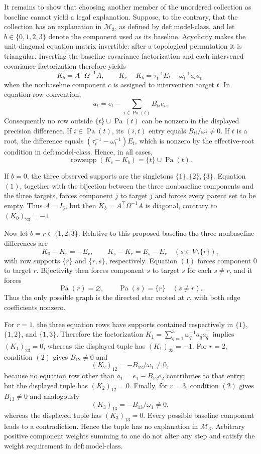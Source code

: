 It remains to show that choosing another member of the unordered collection
as baseline cannot yield a legal explanation.  Suppose, to the contrary, that
the collection has an explanation in \(\mathcal M_3\), as defined by
\(\mathrm{def:model\mbox{-}class}\), and let \(b\in\{0,1,2,3\}\) denote the
component used as its baseline.  Acyclicity makes the unit-diagonal equation
matrix invertible: after a topological permutation it is triangular.  Inverting
the baseline covariance factorization and each intervened covariance
factorization therefore yields
\[
 K_b=A^{\top}\Omega^{-1}A,
 \qquad
 K_c-K_b=\tau_t^{-1}E_t-\omega_t^{-1}a_ta_t^{\top}
\]
when the nonbaseline component \(c\) is assigned to intervention target
\(t\).  In equation-row convention,
\[
 a_t=e_t-\sum_{i\in\operatorname{Pa}(t)}B_{ti}e_i.
\]
Consequently no row outside
\(\{t\}\cup\operatorname{Pa}(t)\) can be nonzero in the displayed precision
difference.  If \(i\in\operatorname{Pa}(t)\), its \((i,t)\) entry equals
\(B_{ti}/\omega_t\neq0\).  If \(t\) is a root, the difference equals
\((\tau_t^{-1}-\omega_t^{-1})E_t\), which is nonzero by the effective-root
condition in \(\mathrm{def:model\mbox{-}class}\).  Hence, in all cases,
\[
 \operatorname{rowsupp}(K_c-K_b)=\{t\}\cup\operatorname{Pa}(t).
 \tag{1}
\]

If \(b=0\), the three observed supports are the singletons
\(\{1\},\{2\},\{3\}\).  Equation \((1)\), together with the bijection between
the three nonbaseline components and the three targets, forces component
\(j\) to target \(j\) and forces every parent set to be empty.  Thus
\(A=I_3\), but then \(K_b=A^{\top}\Omega^{-1}A\) is diagonal, contrary to
\((K_0)_{23}=-1\).

Now let \(b=r\in\{1,2,3\}\).  Relative to this proposed baseline the three
nonbaseline differences are
\[
 K_0-K_r=-E_r,
 \qquad K_s-K_r=E_s-E_r\quad(s\in V\setminus\{r\}),
\]
with row supports \(\{r\}\) and \(\{r,s\}\), respectively.  Equation \((1)\)
forces component \(0\) to target \(r\).  Bijectivity then forces component
\(s\) to target \(s\) for each \(s\neq r\), and it forces
\[
 \operatorname{Pa}(r)=\varnothing,
 \qquad \operatorname{Pa}(s)=\{r\}\quad(s\neq r).
 \tag{2}
\]
Thus the only possible graph is the directed star rooted at \(r\), with both
edge coefficients nonzero.

For \(r=1\), the three equation rows have supports contained respectively in
\(\{1\}\), \(\{1,2\}\), and \(\{1,3\}\).  Therefore the factorization
\(K_1=\sum_{q=1}^3\omega_q^{-1}a_qa_q^{\top}\) implies
\((K_1)_{23}=0\), whereas the displayed tuple has \((K_1)_{23}=-1\).
For \(r=2\), condition \((2)\) gives \(B_{12}\neq0\) and
\[
 (K_2)_{12}=-B_{12}/\omega_1\neq0,
\]
because no equation row other than
\(a_1=e_1-B_{12}e_2\) contributes to that entry; but the displayed tuple has
\((K_2)_{12}=0\).  Finally, for \(r=3\), condition \((2)\) gives
\(B_{13}\neq0\) and analogously
\[
 (K_3)_{13}=-B_{13}/\omega_1\neq0,
\]
whereas the displayed tuple has \((K_3)_{13}=0\).  Every possible baseline
component leads to a contradiction.  Hence the tuple has no explanation in
\(\mathcal M_3\).  Arbitrary positive component weights summing to one do not
alter any step and satisfy the weight requirement in
\(\mathrm{def:model\mbox{-}class}\).
